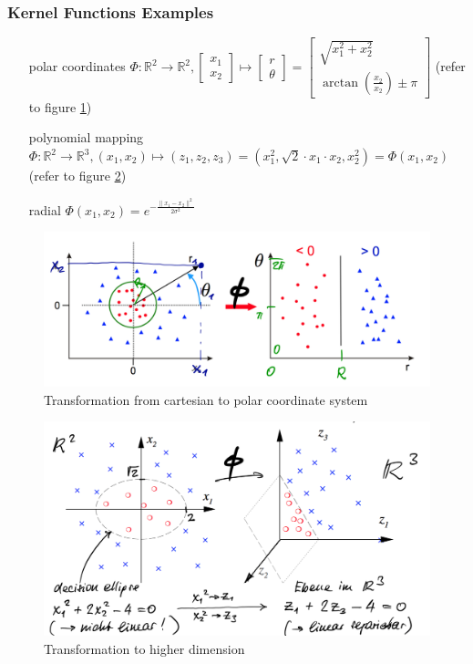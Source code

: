 \documentclass[11pt]{article}
\begin{document}
\subsubsection{Kernel Functions Examples}

\begin{itemize}[leftmargin=*, labelindent=3.5cm, labelsep=0.5cm]
    \item[polar coordinates] $\Phi: \mathbb{R}^2 \rightarrow \mathbb{R}^2, \begin{bmatrix}x_1\\x_2\end{bmatrix}\mapsto\begin{bmatrix}r\\\theta\end{bmatrix}=\begin{bmatrix}\sqrt{x_1^2 + x_2^2}\\\arctan(\frac{x_2}{x_2})\pm\pi\end{bmatrix}$ (refer to figure \ref{fig:kernelfunctionspolarcoordinates})
    \item[polynomial mapping] $\Phi: \mathbb{R}^2 \rightarrow \mathbb{R}^3, (x_1,x_2) \mapsto (z_1,z_2,z_3) = (x_1^2,\sqrt{2}\cdot x_1\cdot x_2, x_2^2) = \Phi(x_1,x_2)$ (refer to figure \ref{fig:kernelfunctionspolynomialmapping})
    \item[radial] $\Phi(x_1,x_2) = e^{-\frac{\| x_1 - x_2 \|^2}{2\sigma^2}}$
\end{itemize}

\begin{figure}[htb!]
    \centering
    \includegraphics[keepaspectratio,width=0.7\linewidth]{Pictures/kernel_functions_polar_coordinates}
    \caption{Transformation from cartesian to polar coordinate system}
    \label{fig:kernelfunctionspolarcoordinates}
\end{figure}

\begin{figure}[htb!]
    \centering
    \includegraphics[keepaspectratio,width=0.7\linewidth]{Pictures/kernel_functions_polynomial_mapping}
    \caption{Transformation to higher dimension}
    \label{fig:kernelfunctionspolynomialmapping}
\end{figure}
\end{document}
